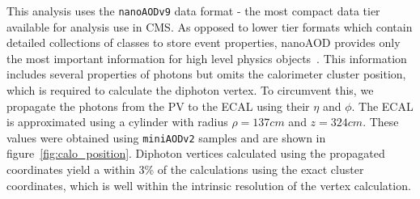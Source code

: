 This analysis uses the \texttt{nanoAODv9} data format - the most compact data tier available for analysis use in CMS. As opposed to lower tier formats which contain detailed collections of classes to store event properties, nanoAOD provides only the most important information for high level physics objects~\cite{nanoaod}. This information includes several properties of photons but omits the calorimeter cluster position, which is required to calculate the diphoton vertex. To circumvent this, we propagate the photons from the PV to the ECAL using their $\eta$ and $\phi$. The ECAL is approximated using a cylinder with radius $\rho=137\unit{cm}$ and $z=324\unit{cm}$. These values were obtained using \texttt{miniAODv2} samples and are shown in figure~\ref{fig:calo_position}. Diphoton vertices calculated using the propagated coordinates yield a \lxy within 3\% of the \lxy calculations using the exact cluster coordinates, which is well within the intrinsic resolution of the vertex calculation.

